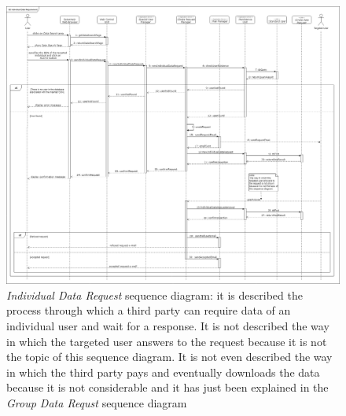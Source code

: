 \begin{figure}[H]
  \begin{center}
  	\includegraphics[width=\textwidth]{./img/sequence/individualDataRequest.png}
    \hspace{0.05\linewidth}
    \centering
    \caption{\textit{Individual Data Request} sequence diagram: it is described the process through which a third party can require data of an individual user and wait for a response. It is not described the way in which the targeted user answers to the request because it is not the topic of this sequence diagram. It is not even described the way in which the third party pays and eventually downloads the data because it is not considerable and it has just been explained in the \textit{Group Data Requst} sequence diagram}
		\label{img:individualDataRequest}
    \end{center}
\end{figure}

